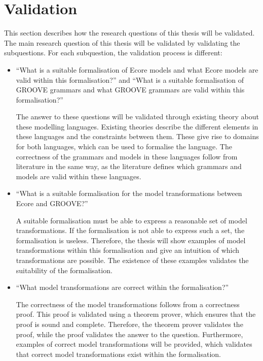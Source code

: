 \section{Validation}
\label{sec:introduction:validation}
This section describes how the research questions of this thesis will be validated. The main research question of this thesis will be validated by validating the subquestions. For each subquestion, the validation process is different:
\begin{itemize}
    \item ``What is a suitable formalisation of Ecore models and what Ecore models are valid within this formalisation?'' and ``What is a suitable formalisation of GROOVE grammars and what GROOVE grammars are valid within this formalisation?''
    
    The answer to these questions will be validated through existing theory about these modelling languages. Existing theories describe the different elements in these languages and the constraints between them. These give rise to domains for both languages, which can be used to formalise the language. The correctness of the grammars and models in these languages follow from literature in the same way, as the literature defines which grammars and models are valid within these languages.
    
    \item ``What is a suitable formalisation for the model transformations between Ecore and GROOVE?'' 
    
    A suitable formalisation must be able to express a reasonable set of model transformations. If the formalisation is not able to express such a set, the formalisation is useless. Therefore, the thesis will show examples of model transformations within this formalisation and give an intuition of which transformations are possible. The existence of these examples validates the suitability of the formalisation.
    
    \item ``What model transformations are correct within the formalisation?'' 
    
    The correctness of the model transformations follows from a correctness proof. This proof is validated using a theorem prover, which ensures that the proof is sound and complete. Therefore, the theorem prover validates the proof, while the proof validates the answer to the question. Furthermore, examples of correct model transformations will be provided, which validates that correct model transformations exist within the formalisation.
    

\end{itemize}
